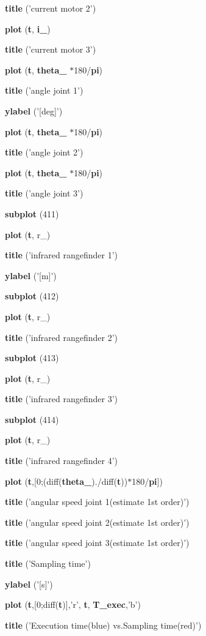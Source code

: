 \begin{DoxyCompactItemize}
\item 
{\bf title} ('current motor 2')
\item 
{\bf plot} ({\bf t}, {\bf i\_})
\item 
{\bf title} ('current motor 3')
\item 
{\bf plot} ({\bf t}, {\bf theta\_} $\ast$180/{\bf pi})
\item 
{\bf title} ('angle joint 1')
\item 
{\bf ylabel} ('[deg]')
\item 
{\bf plot} ({\bf t}, {\bf theta\_} $\ast$180/{\bf pi})
\item 
{\bf title} ('angle joint 2')
\item 
{\bf plot} ({\bf t}, {\bf theta\_} $\ast$180/{\bf pi})
\item 
{\bf title} ('angle joint 3')
\item 
{\bf subplot} (411)
\item 
{\bf plot} ({\bf t}, r\_)
\item 
{\bf title} ('infrared rangefinder 1')
\item 
{\bf ylabel} ('[m]')
\item 
{\bf subplot} (412)
\item 
{\bf plot} ({\bf t}, r\_)
\item 
{\bf title} ('infrared rangefinder 2')
\item 
{\bf subplot} (413)
\item 
{\bf plot} ({\bf t}, r\_)
\item 
{\bf title} ('infrared rangefinder 3')
\item 
{\bf subplot} (414)
\item 
{\bf plot} ({\bf t}, r\_)
\item 
{\bf title} ('infrared rangefinder 4')
\item 
{\bf plot} ({\bf t},[0;(diff({\bf theta\_})./diff({\bf t}))$\ast$180/{\bf pi}])
\item 
{\bf title} ('angular speed joint 1(estimate 1st order)')
\item 
{\bf title} ('angular speed joint 2(estimate 1st order)')
\item 
{\bf title} ('angular speed joint 3(estimate 1st order)')
\item 
{\bf title} ('Sampling time')
\item 
{\bf ylabel} ('[s]')
\item 
{\bf plot} ({\bf t},[0;diff({\bf t})],'r', {\bf t}, {\bf T\_\-exec},'b')
\item 
{\bf title} ('Execution time(blue) vs.Sampling time(red)')
\end{DoxyCompactItemize}

